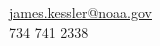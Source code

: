 \documentclass{article}
\begin{document}
\Large
\noindent \href{mailto:james.kessler@noaa.gov?subject=OSM Poster}{james.kessler@noaa.gov}\\
734 741 2338\\
\normalsize
	\nocite{*}
	\printbibliography
\end{document}
